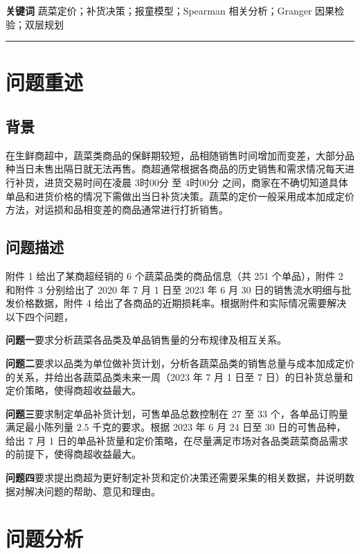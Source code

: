 \vspace{0.5cm}
\noindent \textbf{关键词} 蔬菜定价；补货决策；报童模型；Spearman 相关分析；Granger 因果检验；双层规划
\vspace{0.3cm}
\hrule
\vspace{0.3cm}

\newpage

\section{问题重述}

\subsection{背景}

在生鲜商超中，蔬菜类商品的保鲜期较短，品相随销售时间增加而变差，大部分品种当日未售出隔日就无法再售。商超通常根据各商品的历史销售和需求情况每天进行补货，进货交易时间在凌晨 $3$时$00$分 至 $4$时$00$分 之间，商家在不确切知道具体单品和进货价格的情况下需做出当日补货决策。蔬菜的定价一般采用成本加成定价方法，对运损和品相变差的商品通常进行打折销售。

\subsection{问题描述}

附件 1 给出了某商超经销的 6 个蔬菜品类的商品信息（共 251 个单品），附件 2 和附件 3 分别给出了 2020 年 7 月 1 日至 2023 年 6 月 30 日的销售流水明细与批发价格数据，附件 4 给出了各商品的近期损耗率。根据附件和实际情况需要解决以下四个问题，

\textbf{问题一}要求分析蔬菜各品类及单品销售量的分布规律及相互关系。

\textbf{问题二}要求以品类为单位做补货计划，分析各蔬菜品类的销售总量与成本加成定价的关系，并给出各蔬菜品类未来一周（2023 年 7 月 1 日至 7 日）的日补货总量和定价策略，使得商超收益最大。

\textbf{问题三}要求制定单品补货计划，可售单品总数控制在 $27$ 至 $33$ 个，各单品订购量满足最小陈列量 $2.5$ 千克的要求。根据 2023 年 6 月 24 日至 30 日的可售品种，给出 7 月 1 日的单品补货量和定价策略，在尽量满足市场对各品类蔬菜商品需求的前提下，使得商超收益最大。

\textbf{问题四}要求提出商超为更好制定补货和定价决策还需要采集的相关数据，并说明数据对解决问题的帮助、意见和理由。

\section{问题分析}

